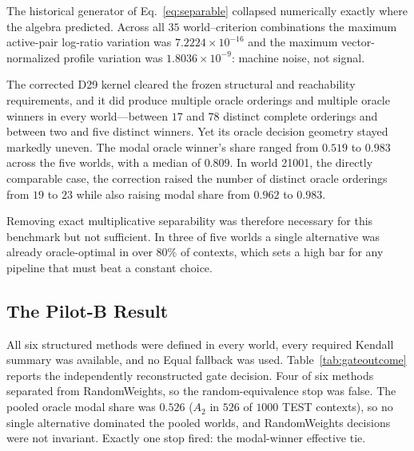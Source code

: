 \documentclass[runningheads,orivec]{llncs}
\begin{document}
The historical generator of Eq.~\eqref{eq:separable} collapsed numerically exactly
where the algebra predicted. Across all $35$ world--criterion combinations the maximum
active-pair log-ratio variation was $7.2224\times10^{-16}$ and the maximum
vector-normalized profile variation was $1.8036\times10^{-9}$: machine noise, not
signal.

The corrected D29 kernel cleared the frozen structural and reachability requirements,
and it did produce multiple oracle orderings and multiple oracle winners in every
world---between $17$ and $78$ distinct complete orderings and between two and five
distinct winners. Yet its oracle decision geometry stayed markedly uneven. The modal
oracle winner's share ranged from $0.519$ to $0.983$ across the five worlds, with a
median of $0.809$. In world 21001, the directly comparable case, the correction raised
the number of distinct oracle orderings from $19$ to $23$ while also raising modal
share from $0.962$ to $0.983$.

Removing exact multiplicative separability was therefore necessary for this benchmark
but not sufficient. In three of five worlds a single alternative was already
oracle-optimal in over $80\%$ of contexts, which sets a high bar for any pipeline that
must beat a constant choice.

\subsection{The Pilot-B Result}
\label{sec:pilotb}

All six structured methods were defined in every world, every required Kendall summary
was available, and no Equal fallback was used. Table~\ref{tab:gateoutcome} reports the
independently reconstructed gate decision. Four of six methods separated from
RandomWeights, so the random-equivalence stop was false. The pooled oracle modal share
was $0.526$ ($A_2$ in $526$ of $1000$ TEST contexts), so no single alternative
dominated the pooled worlds, and RandomWeights decisions were not invariant. Exactly
one stop fired: the modal-winner effective tie.
\end{document}
